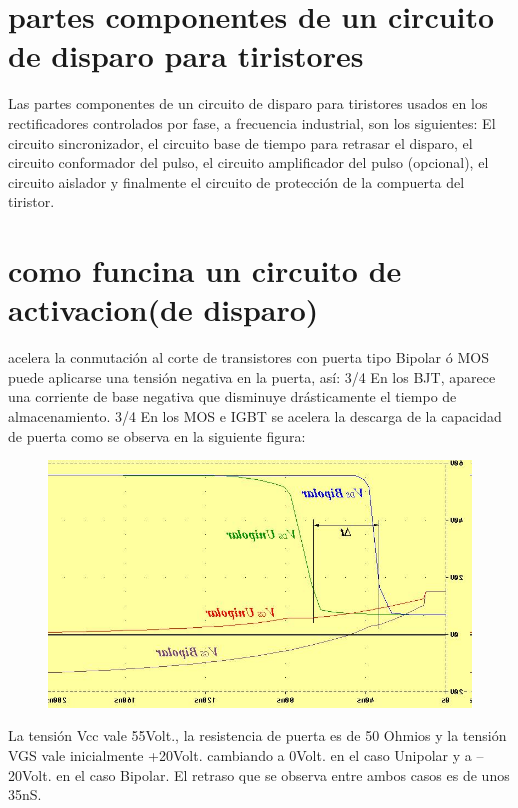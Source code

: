 \documentclass[14pt,letterpaper]{article}
\begin{document}
\section{partes componentes de un circuito de disparo para tiristores}
Las partes componentes de un circuito de disparo para tiristores usados en los
rectificadores controlados por fase, a frecuencia industrial, son los siguientes: El
circuito sincronizador, el circuito base de tiempo para retrasar el disparo, el circuito
conformador del pulso, el circuito amplificador del pulso (opcional), el circuito aislador
y finalmente el circuito de protección de la compuerta del tiristor.
\newpage
\section{como funcina un circuito de activacion(de disparo)}
acelera la conmutación al corte de transistores con puerta tipo Bipolar ó
MOS puede aplicarse una tensión negativa en la puerta, así:
3/4 En los BJT, aparece una corriente de base negativa que disminuye
drásticamente el tiempo de almacenamiento.
3/4 En los MOS e IGBT se acelera la descarga de la capacidad de puerta como se
observa en la siguiente figura:
\begin{figure}[h!]
\centering
\includegraphics[scale=.4]{f}

\end{figure}
La tensión Vcc vale 55Volt., la resistencia de puerta es de 50 Ohmios y la
tensión VGS vale inicialmente +20Volt. cambiando a 0Volt. en el caso
Unipolar y a –20Volt. en el caso Bipolar. El retraso que se observa entre
ambos casos es de unos 35nS.
\linebreak
\linebreak
\linebreak
\linebreak
\end{document}
